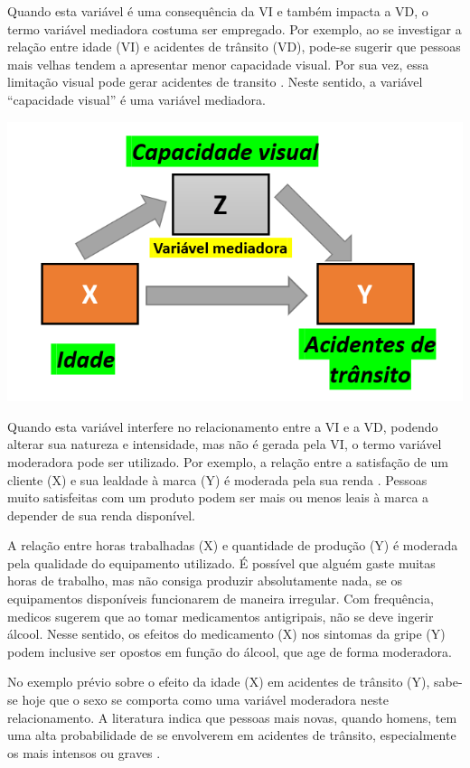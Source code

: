\documentclass[
]{book}
\begin{document}
Quando esta variável é uma consequência da VI e também impacta a VD, o termo variável mediadora costuma ser empregado. Por exemplo, ao se investigar a relação entre idade (VI) e acidentes de trânsito (VD), pode-se sugerir que pessoas mais velhas tendem a apresentar menor capacidade visual. Por sua vez, essa limitação visual pode gerar acidentes de transito \citep{Rhodes2011}. Neste sentido, a variável ``capacidade visual'' é uma variável mediadora.

\includegraphics{./img/cap_mediacao.png}

Quando esta variável interfere no relacionamento entre a VI e a VD, podendo alterar sua natureza e intensidade, mas não é gerada pela VI, o termo variável moderadora pode ser utilizado. Por exemplo, a relação entre a satisfação de um cliente (X) e sua lealdade à marca (Y) é moderada pela sua renda \citep{Sugianto2017}. Pessoas muito satisfeitas com um produto podem ser mais ou menos leais à marca a depender de sua renda disponível.

A relação entre horas trabalhadas (X) e quantidade de produção (Y) é moderada pela qualidade do equipamento utilizado. É possível que alguém gaste muitas horas de trabalho, mas não consiga produzir absolutamente nada, se os equipamentos disponíveis funcionarem de maneira irregular. Com frequência, medicos sugerem que ao tomar medicamentos antigripais, não se deve ingerir álcool. Nesse sentido, os efeitos do medicamento (X) nos sintomas da gripe (Y) podem inclusive ser opostos em função do álcool, que age de forma moderadora.

No exemplo prévio sobre o efeito da idade (X) em acidentes de trânsito (Y), sabe-se hoje que o sexo se comporta como uma variável moderadora neste relacionamento. A literatura indica que pessoas mais novas, quando homens, tem uma alta probabilidade de se envolverem em acidentes de trânsito, especialmente os mais intensos ou graves \citep{Amarasingha2014, PRB2006}.
\end{document}
